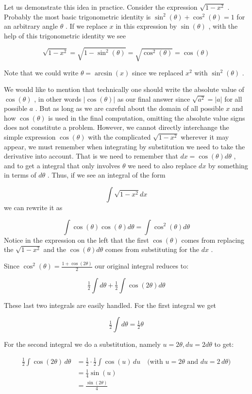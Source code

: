 Let us demonstrate this idea in practice. Consider the expression $\sqrt{1-x^2}$ . Probably the most basic trigonometric identity is $\sin^2(\theta)+\cos^2(\theta)=1$ for an arbitrary angle $\theta$ . If we replace $x$ in this expression by $\sin(\theta)$ , with the help of this trigonometric identity we see


\[
\sqrt{1-x^2}=\sqrt{1-\sin^2(\theta)}=\sqrt{\cos^2(\theta)}=\cos(\theta)
\]

Note that we could write $\theta=\arcsin(x)$ since we replaced $x^2$ with $\sin^2(\theta)$ .


We would like to mention that technically one should write the absolute value of $\cos(\theta)$ , in other words $\bigl|\cos(\theta)\bigr|$ as our final answer since $\sqrt{a^2}=|a|$ for all possible $a$ . But as long as we are careful about the domain of all possible $x$ and how $\cos(\theta)$ is used in the final computation, omitting the absolute value signs does not constitute a problem. However, we cannot directly interchange the simple expression $\cos(\theta)$ with the complicated $\sqrt{1-x^2}$ wherever it may appear, we must remember when integrating by substitution we need to take the derivative into account. That is we need to remember that $dx=\cos(\theta)d\theta$ , and to get a integral that only involves $\theta$ we need to also replace $dx$ by something in terms of $d\theta$ . Thus, if we see an integral of the form


\[
\int\sqrt{1-x^2}dx
\] we can rewrite it as


\[
\int\cos(\theta)\cos(\theta)d\theta=\int\cos^2(\theta)d\theta
\] Notice in the expression on the left that the first $\cos(\theta)$ comes from replacing the $\sqrt{1-x^2}$ and the $\cos(\theta)d\theta$ comes from substituting for the $dx$ .


Since $\cos^2(\theta)=\frac{1+\cos(2\theta)}{2}$ our original integral reduces to:


\[
\tfrac12\int d\theta+\tfrac12\int\cos(2\theta)d\theta
\]


These last two integrals are easily handled. For the first integral we get


\[
\tfrac12\int d\theta=\tfrac12\theta
\]


For the second integral we do a substitution, namely $u=2\theta,du=2d\theta$ to get:


\begin{align}
\tfrac{1}{2}\int\cos(2\theta)\,d\theta &= \tfrac{1}{2}\cdot\tfrac{1}{2}\int\cos(u)\,du \quad \text{(with } u = 2\theta \text{ and } du = 2\,d\theta\text{)} \\&= \tfrac{1}{4}\sin(u) \\&= \frac{\sin(2\theta)}{4}
\end{align}


